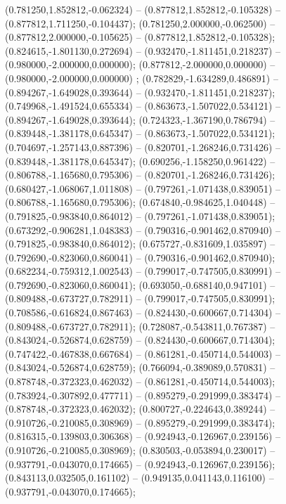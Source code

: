 (0.781250,1.852812,-0.062324) -- (0.877812,1.852812,-0.105328) -- (0.877812,1.711250,-0.104437);
 (0.781250,2.000000,-0.062500) -- (0.877812,2.000000,-0.105625) -- (0.877812,1.852812,-0.105328);
 (0.824615,-1.801130,0.272694) -- (0.932470,-1.811451,0.218237) -- (0.980000,-2.000000,0.000000);
 (0.877812,-2.000000,0.000000) -- (0.980000,-2.000000,0.000000) ;
 (0.782829,-1.634289,0.486891) -- (0.894267,-1.649028,0.393644) -- (0.932470,-1.811451,0.218237);
 (0.749968,-1.491524,0.655334) -- (0.863673,-1.507022,0.534121) -- (0.894267,-1.649028,0.393644);
 (0.724323,-1.367190,0.786794) -- (0.839448,-1.381178,0.645347) -- (0.863673,-1.507022,0.534121);
 (0.704697,-1.257143,0.887396) -- (0.820701,-1.268246,0.731426) -- (0.839448,-1.381178,0.645347);
 (0.690256,-1.158250,0.961422) -- (0.806788,-1.165680,0.795306) -- (0.820701,-1.268246,0.731426);
 (0.680427,-1.068067,1.011808) -- (0.797261,-1.071438,0.839051) -- (0.806788,-1.165680,0.795306);
 (0.674840,-0.984625,1.040448) -- (0.791825,-0.983840,0.864012) -- (0.797261,-1.071438,0.839051);
 (0.673292,-0.906281,1.048383) -- (0.790316,-0.901462,0.870940) -- (0.791825,-0.983840,0.864012);
 (0.675727,-0.831609,1.035897) -- (0.792690,-0.823060,0.860041) -- (0.790316,-0.901462,0.870940);
 (0.682234,-0.759312,1.002543) -- (0.799017,-0.747505,0.830991) -- (0.792690,-0.823060,0.860041);
 (0.693050,-0.688140,0.947101) -- (0.809488,-0.673727,0.782911) -- (0.799017,-0.747505,0.830991);
 (0.708586,-0.616824,0.867463) -- (0.824430,-0.600667,0.714304) -- (0.809488,-0.673727,0.782911);
 (0.728087,-0.543811,0.767387) -- (0.843024,-0.526874,0.628759) -- (0.824430,-0.600667,0.714304);
 (0.747422,-0.467838,0.667684) -- (0.861281,-0.450714,0.544003) -- (0.843024,-0.526874,0.628759);
 (0.766094,-0.389089,0.570831) -- (0.878748,-0.372323,0.462032) -- (0.861281,-0.450714,0.544003);
 (0.783924,-0.307892,0.477711) -- (0.895279,-0.291999,0.383474) -- (0.878748,-0.372323,0.462032);
 (0.800727,-0.224643,0.389244) -- (0.910726,-0.210085,0.308969) -- (0.895279,-0.291999,0.383474);
 (0.816315,-0.139803,0.306368) -- (0.924943,-0.126967,0.239156) -- (0.910726,-0.210085,0.308969);
 (0.830503,-0.053894,0.230017) -- (0.937791,-0.043070,0.174665) -- (0.924943,-0.126967,0.239156);
 (0.843113,0.032505,0.161102) -- (0.949135,0.041143,0.116100) -- (0.937791,-0.043070,0.174665);
